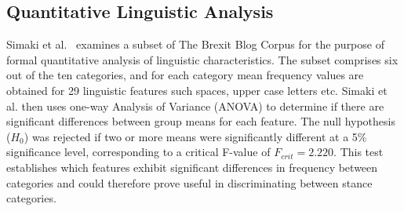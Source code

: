 \documentclass[Dissertation.tex]{subfiles}
\begin{document}
\subsection{Quantitative Linguistic Analysis}\label{sec:quantAnalysis}
Simaki et al.\ \cite{simakiEvaluatingStanceannotatedSentences2018} examines a subset of The Brexit Blog Corpus for the purpose of formal quantitative analysis of linguistic characteristics. The subset comprises six out of the ten categories, and for each category mean frequency values are obtained for 29 linguistic features such spaces, upper case letters etc. Simaki et al.\cite{simakiEvaluatingStanceannotatedSentences2018} then uses one-way Analysis of Variance (ANOVA) to determine if there are significant differences between group means for each feature. The null hypothesis ($ H_0 $) was rejected if two or more means were significantly different at a 5\% significance level, corresponding to a critical F-value of $ F_{crit} =2.220 $. This test establishes which features exhibit significant differences in frequency between categories and could therefore prove useful in discriminating between stance categories. 
\end{document}
